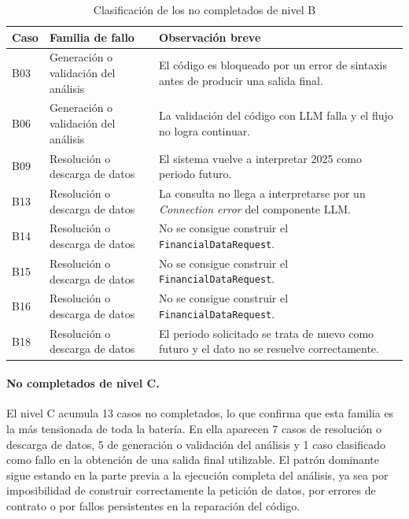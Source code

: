 \begin{table}[H]
\centering
\begin{tabularx}{\textwidth}{L{1.2cm}L{4.8cm}Y}
\toprule
Caso & Familia de fallo & Observaci\'on breve \\
\midrule
B03 & Generaci\'on o validaci\'on del an\'alisis & El c\'odigo es bloqueado por un error de sintaxis antes de producir una salida final. \\
B06 & Generaci\'on o validaci\'on del an\'alisis & La validaci\'on del c\'odigo con LLM falla y el flujo no logra continuar. \\
B09 & Resoluci\'on o descarga de datos & El sistema vuelve a interpretar 2025 como periodo futuro. \\
B13 & Resoluci\'on o descarga de datos & La consulta no llega a interpretarse por un \textit{Connection error} del componente LLM. \\
B14 & Resoluci\'on o descarga de datos & No se consigue construir el \texttt{FinancialDataRequest}. \\
B15 & Resoluci\'on o descarga de datos & No se consigue construir el \texttt{FinancialDataRequest}. \\
B16 & Resoluci\'on o descarga de datos & No se consigue construir el \texttt{FinancialDataRequest}. \\
B18 & Resoluci\'on o descarga de datos & El periodo solicitado se trata de nuevo como futuro y el dato no se resuelve correctamente. \\
\bottomrule
\end{tabularx}
\caption{Clasificaci\'on de los no completados de nivel B}
\label{tab:no-completados-b}
\end{table}

\paragraph{No completados de nivel C.}
El nivel C acumula 13 casos no completados, lo que confirma que esta familia es la m\'as tensionada de toda la bater\'ia. 
En ella aparecen 7 casos de resoluci\'on o descarga de datos, 5 de generaci\'on o validaci\'on del an\'alisis y 1 caso 
clasificado como fallo en la obtenci\'on de una salida final utilizable. El patr\'on dominante sigue estando en la parte 
previa a la ejecuci\'on completa del an\'alisis, ya sea por imposibilidad de construir correctamente la petici\'on de datos, 
por errores de contrato o por fallos persistentes en la reparaci\'on del c\'odigo.

